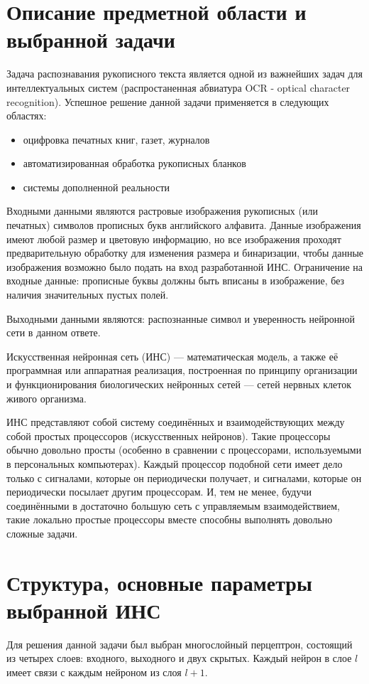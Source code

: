 \documentclass[russian,utf8,emptystyle]{eskdtext}
\begin{document}
\section{Описание предметной области и выбранной задачи}
Задача распознавания рукописного текста является одной из важнейших задач для интеллектуальных систем (распростаненная абвиатура OCR - optical character recognition). Успешное решение данной задачи применяется в следующих областях:
\begin{itemize}
\item оцифровка печатных книг, газет, журналов
\item автоматизированная обработка рукописных бланков
\item системы дополненной реальности
\end{itemize}

Входными данными являются растровые изображения рукописных (или печатных) символов прописных букв английского алфавита. Данные изображения имеют любой размер и цветовую информацию, но все изображения проходят предварительную обработку для изменения размера и бинаризации, чтобы данные изображения возможно было подать на вход разработанной ИНС. Ограничение на входные данные: прописные буквы должны быть вписаны в изображение, без наличия значительных пустых полей.

Выходными данными являются: распознанные символ и уверенность нейронной сети в данном ответе.

Искусственная нейронная сеть (ИНС) — математическая модель, а также её программная или аппаратная реализация, построенная по принципу организации и функционирования биологических нейронных сетей — сетей нервных клеток живого организма.

ИНС представляют собой систему соединённых и взаимодействующих между собой простых процессоров (искусственных нейронов). Такие процессоры обычно довольно просты (особенно в сравнении с процессорами, используемыми в персональных компьютерах). Каждый процессор подобной сети имеет дело только с сигналами, которые он периодически получает, и сигналами, которые он периодически посылает другим процессорам. И, тем не менее, будучи соединёнными в достаточно большую сеть с управляемым взаимодействием, такие локально простые процессоры вместе способны выполнять довольно сложные задачи.

\section{Структура, основные параметры выбранной ИНС}
Для решения данной задачи был выбран многослойный перцептрон, состоящий из четырех слоев: входного, выходного и двух скрытых. Каждый нейрон в слое $l$ имеет связи с каждым нейроном из слоя $l+1$.
\end{document}

